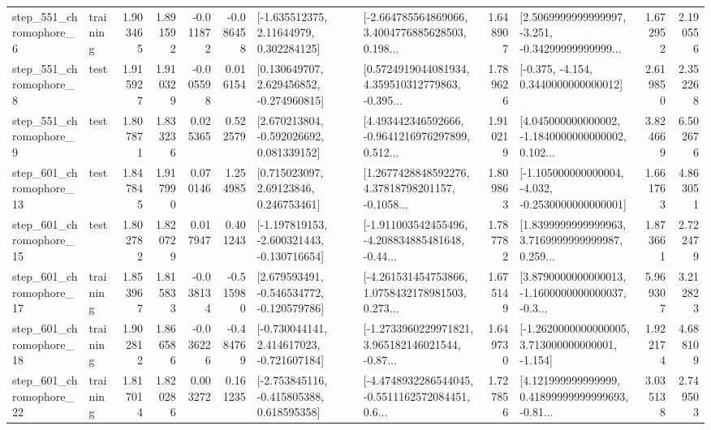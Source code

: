 \begin{tabular}{llrrrrllrlrr}
   step\_551\_chromophore\_6 &  training &      1.903465 &    1.891592 &     -0.011872 & -0.086458 &     [-1.635512375, 2.11644979, 0.302284125] &  [-2.664785564869066, 3.4004776885628503, 0.198... &       1.648907 &  [2.5069999999999997, -3.251, -0.34299999999999... &            1.672952 &          2.190556 \\
   step\_551\_chromophore\_8 &      test &      1.915927 &    1.910329 &     -0.005598 &  0.016154 &    [0.130649707, 2.629456852, -0.274960815] &  [0.5724919044081934, 4.359510312779863, -0.395... &       1.789626 &               [-0.375, -4.154, 0.3440000000000012] &            2.619850 &          2.352268 \\
   step\_551\_chromophore\_9 &      test &      1.807871 &    1.833236 &      0.025365 &  0.522579 &    [2.670213804, -0.592026692, 0.081339152] &  [4.493442346592666, -0.9641216976297899, 0.512... &       1.910219 &  [4.045000000000002, -1.1840000000000002, 0.102... &            3.824669 &          6.502676 \\
  step\_601\_chromophore\_13 &      test &      1.847845 &    1.917990 &      0.070146 &  1.254985 &      [0.715023097, 2.69123846, 0.246753461] &  [1.2677428848592276, 4.37818798201157, -0.1058... &       1.809863 &  [-1.105000000000004, -4.032, -0.2530000000000001] &            1.661763 &          4.863051 \\
  step\_601\_chromophore\_15 &      test &      1.802782 &    1.820729 &      0.017947 &  0.401243 &  [-1.197819153, -2.600321443, -0.130716654] &  [-1.911003542455496, -4.208834885481648, -0.44... &       1.787782 &  [1.8399999999999963, 3.7169999999999987, 0.259... &            1.873661 &          2.722479 \\
  step\_601\_chromophore\_17 &  training &      1.853967 &    1.815833 &     -0.038134 & -0.515980 &   [2.679593491, -0.546534772, -0.120579786] &  [-4.261531454753866, 1.0758432178981503, 0.273... &       1.675149 &  [3.8790000000000013, -1.1600000000000037, -0.3... &            5.969307 &          3.212823 \\
  step\_601\_chromophore\_18 &  training &      1.902812 &    1.866586 &     -0.036226 & -0.484769 &   [-0.730044141, 2.414617023, -0.721607184] &  [-1.2733960229971821, 3.965182146021544, -0.87... &       1.649730 &   [-1.2620000000000005, 3.713000000000001, -1.154] &            1.922174 &          4.688109 \\
  step\_601\_chromophore\_22 &  training &      1.817014 &    1.820286 &      0.003272 &  0.161235 &   [-2.753845116, -0.415805388, 0.618595358] &  [-4.4748932286544045, -0.5511162572084451, 0.6... &       1.727856 &  [4.121999999999999, 0.41899999999999693, -0.81... &            3.035138 &          2.749503 \\

\end{tabular}
